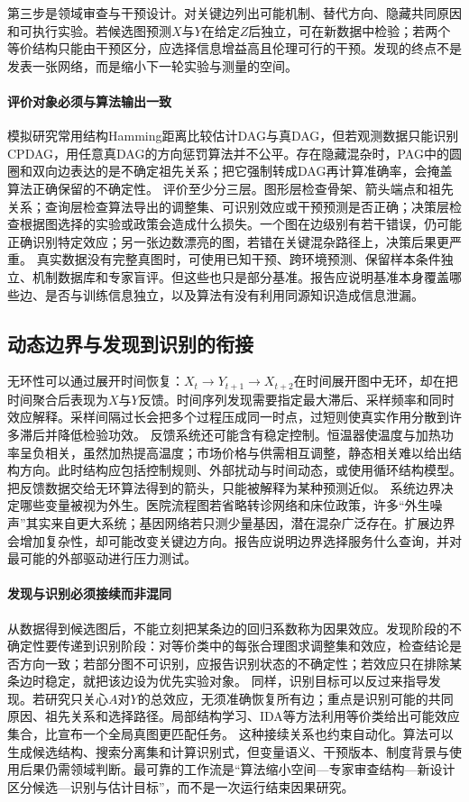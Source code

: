 第三步是领域审查与干预设计。对关键边列出可能机制、替代方向、隐藏共同原因和可执行实验。若候选图预测$X$与$Y$在给定$Z$后独立，可在新数据中检验；若两个等价结构只能由干预区分，应选择信息增益高且伦理可行的干预。发现的终点不是发表一张网络，而是缩小下一轮实验与测量的空间。

\paragraph{评价对象必须与算法输出一致}

模拟研究常用结构Hamming距离比较估计DAG与真DAG，但若观测数据只能识别CPDAG，用任意真DAG的方向惩罚算法并不公平。存在隐藏混杂时，PAG中的圆圈和双向边表达的是不确定祖先关系；把它强制转成DAG再计算准确率，会掩盖算法正确保留的不确定性。
评价至少分三层。图形层检查骨架、箭头端点和祖先关系；查询层检查算法导出的调整集、可识别效应或干预预测是否正确；决策层检查根据图选择的实验或政策会造成什么损失。一个图在边级别有若干错误，仍可能正确识别特定效应；另一张边数漂亮的图，若错在关键混杂路径上，决策后果更严重。
真实数据没有完整真图时，可使用已知干预、跨环境预测、保留样本条件独立、机制数据库和专家盲评。但这些也只是部分基准。报告应说明基准本身覆盖哪些边、是否与训练信息独立，以及算法有没有利用同源知识造成信息泄漏。

\subsection{动态边界与发现到识别的衔接}

无环性可以通过展开时间恢复：$X_t\rightarrow Y_{t+1}\rightarrow X_{t+2}$在时间展开图中无环，却在把时间聚合后表现为$X$与$Y$反馈。时间序列发现需要指定最大滞后、采样频率和同时效应解释。采样间隔过长会把多个过程压成同一时点，过短则使真实作用分散到许多滞后并降低检验功效。
反馈系统还可能含有稳定控制。恒温器使温度与加热功率呈负相关，虽然加热提高温度；市场价格与供需相互调整，静态相关难以给出结构方向。此时结构应包括控制规则、外部扰动与时间动态，或使用循环结构模型。把反馈数据交给无环算法得到的箭头，只能被解释为某种预测近似。
系统边界决定哪些变量被视为外生。医院流程图若省略转诊网络和床位政策，许多“外生噪声”其实来自更大系统；基因网络若只测少量基因，潜在混杂广泛存在。扩展边界会增加复杂性，却可能改变关键边方向。报告应说明边界选择服务什么查询，并对最可能的外部驱动进行压力测试。

\paragraph{发现与识别必须接续而非混同}

从数据得到候选图后，不能立刻把某条边的回归系数称为因果效应。发现阶段的不确定性要传递到识别阶段：对等价类中的每张合理图求调整集和效应，检查结论是否方向一致；若部分图不可识别，应报告识别状态的不确定性；若效应只在排除某条边时稳定，就把该边设为优先实验对象。
同样，识别目标可以反过来指导发现。若研究只关心$A$对$Y$的总效应，无须准确恢复所有边；重点是识别可能的共同原因、祖先关系和选择路径。局部结构学习、IDA等方法利用等价类给出可能效应集合，比宣布一个全局真图更匹配任务。
这种接续关系也约束自动化。算法可以生成候选结构、搜索分离集和计算识别式，但变量语义、干预版本、制度背景与使用后果仍需领域判断。最可靠的工作流是“算法缩小空间---专家审查结构---新设计区分候选---识别与估计目标”，而不是一次运行结束因果研究。

